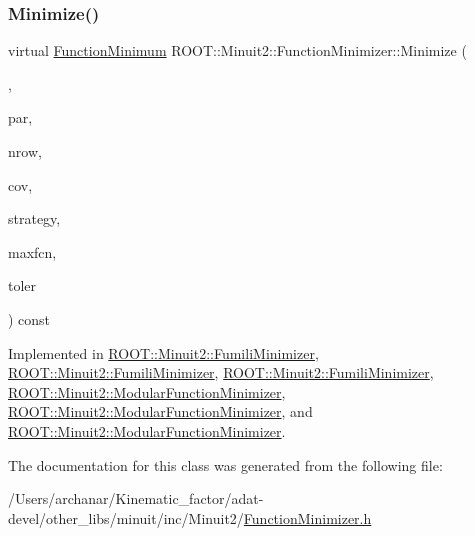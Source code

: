 \subsubsection{\texorpdfstring{Minimize()}{Minimize()}\hspace{0.1cm}{\footnotesize\ttfamily [12/12]}}
{\footnotesize\ttfamily virtual \mbox{\hyperlink{classROOT_1_1Minuit2_1_1FunctionMinimum}{Function\+Minimum}} R\+O\+O\+T\+::\+Minuit2\+::\+Function\+Minimizer\+::\+Minimize (\begin{DoxyParamCaption}\item[{const \mbox{\hyperlink{classROOT_1_1Minuit2_1_1FCNGradientBase}{F\+C\+N\+Gradient\+Base}} \&}]{,  }\item[{const std\+::vector$<$ double $>$ \&}]{par,  }\item[{unsigned int}]{nrow,  }\item[{const std\+::vector$<$ double $>$ \&}]{cov,  }\item[{unsigned int}]{strategy,  }\item[{unsigned int}]{maxfcn,  }\item[{double}]{toler }\end{DoxyParamCaption}) const\hspace{0.3cm}{\ttfamily [pure virtual]}}



Implemented in \mbox{\hyperlink{classROOT_1_1Minuit2_1_1FumiliMinimizer_aa17be65e26311aa25f6fd3680f747958}{R\+O\+O\+T\+::\+Minuit2\+::\+Fumili\+Minimizer}}, \mbox{\hyperlink{classROOT_1_1Minuit2_1_1FumiliMinimizer_aa17be65e26311aa25f6fd3680f747958}{R\+O\+O\+T\+::\+Minuit2\+::\+Fumili\+Minimizer}}, \mbox{\hyperlink{classROOT_1_1Minuit2_1_1FumiliMinimizer_aa17be65e26311aa25f6fd3680f747958}{R\+O\+O\+T\+::\+Minuit2\+::\+Fumili\+Minimizer}}, \mbox{\hyperlink{classROOT_1_1Minuit2_1_1ModularFunctionMinimizer_a1cab3c0cc40932cb9287232fe9cf7437}{R\+O\+O\+T\+::\+Minuit2\+::\+Modular\+Function\+Minimizer}}, \mbox{\hyperlink{classROOT_1_1Minuit2_1_1ModularFunctionMinimizer_a97334cf66537c195aa8d6df14e745bef}{R\+O\+O\+T\+::\+Minuit2\+::\+Modular\+Function\+Minimizer}}, and \mbox{\hyperlink{classROOT_1_1Minuit2_1_1ModularFunctionMinimizer_a97334cf66537c195aa8d6df14e745bef}{R\+O\+O\+T\+::\+Minuit2\+::\+Modular\+Function\+Minimizer}}.



The documentation for this class was generated from the following file\+:\begin{DoxyCompactItemize}
\item 
/\+Users/archanar/\+Kinematic\+\_\+factor/adat-\/devel/other\+\_\+libs/minuit/inc/\+Minuit2/\mbox{\hyperlink{adat-devel_2other__libs_2minuit_2inc_2Minuit2_2FunctionMinimizer_8h}{Function\+Minimizer.\+h}}\end{DoxyCompactItemize}
